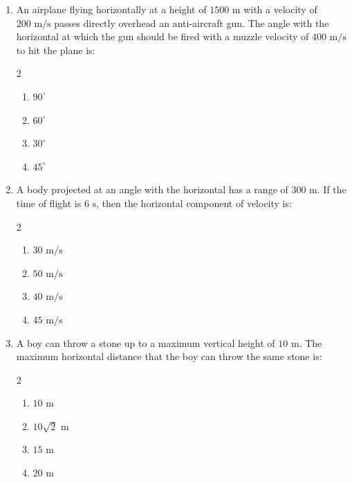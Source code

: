 \documentclass[11pt,a4paper]{article}
\begin{document}
\begin{enumerate}[label=\textbf{\textcolor{l1Green}{Q\arabic*.}},leftmargin=24pt,itemsep=10pt]
  \item An airplane flying horizontally at a height of $1500\text{ m}$ with a velocity of $200\text{ m/s}$ passes directly overhead an anti-aircraft gun. The angle with the horizontal at which the gun should be fired with a muzzle velocity of $400\text{ m/s}$ to hit the plane is:
  \begin{multicols}{2}
  \begin{enumerate}[label=\textbf{\textcolor{primaryDark}{(\Alph*)}},itemsep=2pt]
    \item $90^\circ$
    \item $60^\circ$
    \item $30^\circ$
    \item $45^\circ$
  \end{enumerate}
  \end{multicols}

  \item A body projected at an angle with the horizontal has a range of $300\text{ m}$. If the time of flight is $6\text{ s}$, then the horizontal component of velocity is:
  \begin{multicols}{2}
  \begin{enumerate}[label=\textbf{\textcolor{primaryDark}{(\Alph*)}},itemsep=2pt]
    \item $30\text{ m/s}$
    \item $50\text{ m/s}$
    \item $40\text{ m/s}$
    \item $45\text{ m/s}$
  \end{enumerate}
  \end{multicols}

  \item A boy can throw a stone up to a maximum vertical height of $10\text{ m}$. The maximum horizontal distance that the boy can throw the same stone is:
  \begin{multicols}{2}
  \begin{enumerate}[label=\textbf{\textcolor{primaryDark}{(\Alph*)}},itemsep=2pt]
    \item $10\text{ m}$
    \item $10\sqrt{2}\text{ m}$
    \item $15\text{ m}$
    \item $20\text{ m}$
  \end{enumerate}
  \end{multicols}


\end{enumerate}
\end{document}
